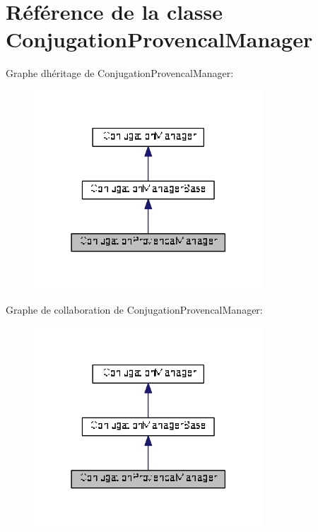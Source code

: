 \hypertarget{class_conjugation_provencal_manager}{}\section{Référence de la classe Conjugation\+Provencal\+Manager}
\label{class_conjugation_provencal_manager}


Graphe d\textquotesingle{}héritage de Conjugation\+Provencal\+Manager\+:
\nopagebreak
\begin{figure}[H]
\begin{center}
\leavevmode
\includegraphics[width=243pt]{class_conjugation_provencal_manager__inherit__graph}
\end{center}
\end{figure}


Graphe de collaboration de Conjugation\+Provencal\+Manager\+:
\nopagebreak
\begin{figure}[H]
\begin{center}
\leavevmode
\includegraphics[width=243pt]{class_conjugation_provencal_manager__coll__graph}
\end{center}
\end{figure}
